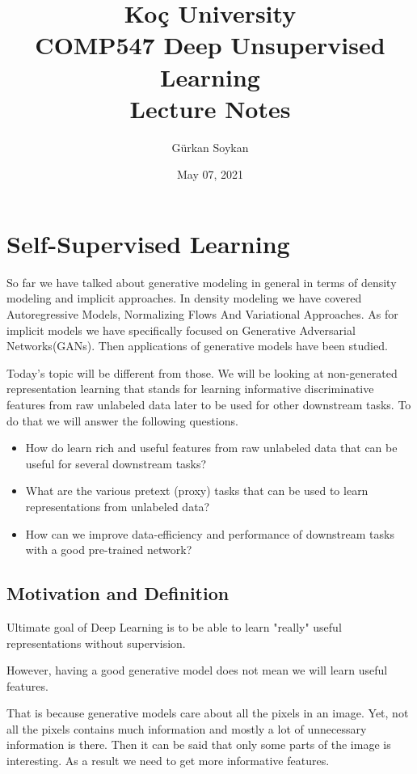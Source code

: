 \documentclass{article}
\title{Ko\c{c} University
\\COMP547 Deep Unsupervised Learning
\\ Lecture Notes}
\author{Gürkan Soykan}
\date{May 07, 2021}
\begin{document}
   \maketitle
   \setcounter{section}{7}
   \section{Self-Supervised Learning}
   So far we have talked about generative modeling in general in terms
of density modeling and implicit approaches. In density modeling
we have covered Autoregressive Models, Normalizing Flows And
Variational Approaches. As for implicit models we have specifically
focused on Generative Adversarial Networks(GANs). Then applications
of generative models have been studied.
 
\par
Today's topic will be different from those. We will be looking
at non-generated representation learning that stands for
learning informative discriminative features from raw unlabeled data
later to be used for other downstream tasks. To do that we will
answer the following questions.
 
\begin{itemize}
   \item How do learn rich and useful features from
   raw unlabeled data that can be
   useful for several downstream tasks?
   \item What are the various pretext (proxy)
   tasks that can be used to learn
   representations from unlabeled data?   
   \item How can we improve data-efficiency
   and performance of downstream tasks
   with a good pre-trained network?
\end{itemize}
 
\subsection{Motivation and Definition}
\label{sec:subsections}
 
Ultimate goal of Deep Learning is to be able to learn
"really" useful representations without supervision.
 
However, having a good generative model does not mean
we will learn useful features.
 
That is because generative models care about all the
pixels in an image. Yet, not all the pixels contains much information
and mostly a lot of unnecessary information is there.
Then it can be said that only some parts of the image is
interesting. As a result we need to get more informative features.
 
\end{document}
